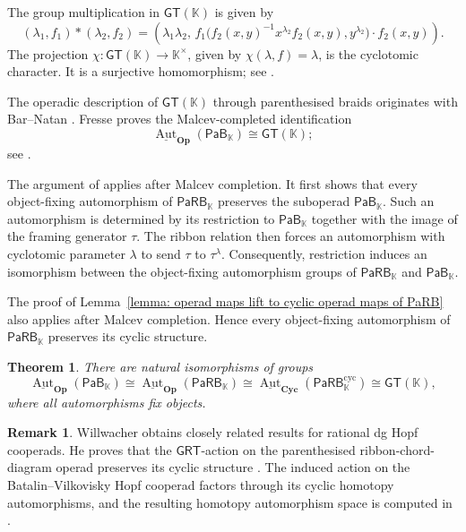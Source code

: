 \documentclass{amsart}
\newcommand{\kk}{\mathbb{K}}    %
\newcommand{\PaRB}{\mathsf{PaRB}}
\newcommand{\PaB}{\mathsf{PaB}}
\newcommand{\Cyc}{\mathbf{Cyc}}
\newcommand{\Op}{\mathbf{Op}}
\newcommand{\Aut}{\operatorname{Aut}}
\newcommand{\gt}{\mathsf{GT}}
\newtheorem{thm}[theorem]{Theorem}%
\theoremstyle{definition}
\newtheorem{remark}[theorem]{Remark}%
\numberwithin{equation}{section}
\begin{document}
The group multiplication in $\gt(\kk)$ is given by
\begin{equation}\label{eqn:GT(K) multiplication}
 (\lambda_1,f_1)*(\lambda_2,f_2)
=
\left(
\lambda_1\lambda_2,\,
f_1\bigl(
f_2(x,y)^{-1}x^{\lambda_2}f_2(x,y),
y^{\lambda_2}
\bigr)\cdot f_2(x,y)
\right).   
\end{equation}
The projection $\chi\colon\gt(\kk)\to\kk^\times$, given by $\chi(\lambda,f)=\lambda$, is the cyclotomic character. It is a surjective homomorphism; see \cite[Section~5]{Drin}.

The operadic description of $\gt(\kk)$ through parenthesised
braids originates with Bar--Natan \cite{BN}. Fresse proves the
Malcev-completed identification
\[
\underline{\Aut}_{\Op}(\PaB_{\kk})
\cong
\gt(\kk);
\]
see \cite[Theorem~11.1.7]{FresseBook1}.

The argument of
\cite[Proposition~7.11]{Boavida-Horel-Robertson} applies after
Malcev completion. It first shows that every object-fixing
automorphism of $\PaRB_{\kk}$ preserves the suboperad
$\PaB_{\kk}$. Such an automorphism is determined by its restriction
to $\PaB_{\kk}$ together with the image of the framing generator
$\tau$. The ribbon relation then forces an automorphism with
cyclotomic parameter $\lambda$ to send $\tau$ to $\tau^\lambda$.
Consequently, restriction induces an isomorphism between the
object-fixing automorphism groups of $\PaRB_{\kk}$ and
$\PaB_{\kk}$.

The proof of
Lemma~\ref{lemma: operad maps lift to cyclic operad maps of PaRB}
also applies after Malcev completion. Hence every object-fixing
automorphism of $\PaRB_{\kk}$ preserves its cyclic structure.

\begin{thm}
\label{thm:prounipotent_GT_identifications}
There are natural isomorphisms of groups
\[
\underline{\Aut}_{\Op}(\PaB_{\kk})
\cong
\underline{\Aut}_{\Op}(\PaRB_{\kk})
\cong
\underline{\Aut}_{\Cyc}(\PaRB_{\kk}^{\mathrm{cyc}})
\cong
\gt(\kk),
\]
where all automorphisms fix objects.
\end{thm}

\begin{remark}
Willwacher obtains closely related results for rational
dg Hopf cooperads. He proves that the $\mathsf{GRT}$-action
on the parenthesised ribbon-chord-diagram operad preserves
its cyclic structure
\cite[Proposition~5.2]{willwacher2024cyclic}.
The induced action on the Batalin--Vilkovisky Hopf
cooperad factors through its cyclic homotopy
automorphisms, and the resulting homotopy automorphism
space is computed in
\cite[Corollaries~5.3 and~1.5]{willwacher2024cyclic}.
\end{remark}
\end{document}
